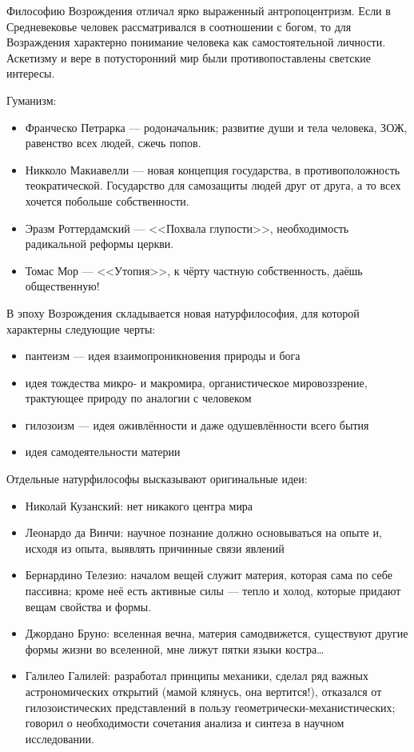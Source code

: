 
Философию Возрождения отличал ярко выраженный антропоцентризм. Если в Средневековье человек рассматривался в соотношении с богом, то для Возраждения характерно понимание человека как самостоятельной личности. Аскетизму и вере в потусторонний мир были противопоставлены светские интересы.

Гуманизм:
\begin{itemize}
    \item Франческо Петрарка --- родоначальник; развитие души и тела человека, ЗОЖ, равенство всех людей, сжечь попов.
    \item Никколо Макиавелли --- новая концепция государства, в противоположность теократической. Государство для самозащиты людей друг от друга, а то всех хочется побольше собственности.
    \item Эразм Роттердамский --- <<Похвала глупости>>, необходимость радикальной реформы церкви.
    \item Томас Мор --- <<Утопия>>, к чёрту частную собственность, даёшь общественную!
\end{itemize}

В эпоху Возрождения складывается новая натурфилософия, для которой характерны следующие черты:
\begin{itemize}
    \item пантеизм --- идея взаимопроникновения природы и бога
    \item идея тождества микро- и макромира, органистическое мировоззрение, трактующее природу по аналогии с человеком
    \item гилозоизм --- идея оживлённости и даже одушевлённости всего бытия
    \item идея самодеятельности материи 
\end{itemize}
Отдельные натурфилософы высказывают оригинальные идеи:
\begin{itemize}
    \item Николай Кузанский: нет никакого центра мира
    \item Леонардо да Винчи: научное познание должно основываться на опыте и, исходя из опыта, выявлять причинные связи явлений
    \item Бернардино Телезио: началом вещей служит материя, которая сама по себе пассивна; кроме неё есть активные силы --- тепло и холод, которые придают вещам свойства и формы.
    \item Джордано Бруно: вселенная вечна, материя самодвижется, существуют другие формы жизни во вселенной, мне лижут пятки языки костра\ldots
    \item Галилео Галилей: разработал принципы механики, сделал ряд важных астрономических открытий (мамой клянусь, она вертится!), отказался от гилозоистических представлений в пользу геометрически-механистических; говорил о необходимости сочетания анализа и синтеза в научном исследовании.
\end{itemize}